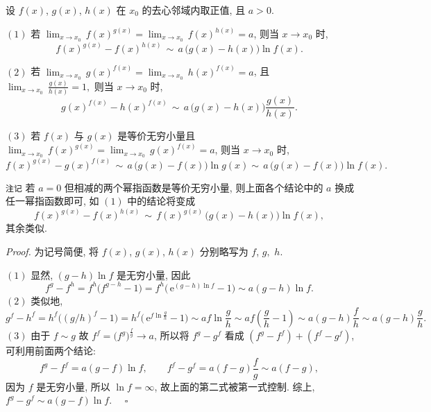 


\begin{theorem}{}
设 $f(x)$, $g(x)$, $h(x)$ 在 $x_{0}$ 的去心邻域内取正值,
且 $a>0$. 

$(1)$ 若 ${\displaystyle \lim_{x\to x_{0}}}\,f(x)^{g(x)}={\displaystyle \lim_{x\to x_{0}}}\,f(x)^{h(x)}=a$,
则当 $x\to x_{0}$ 时, 
$$
f(x)^{g(x)}-f(x)^{h(x)}\,\sim\,a\,\big(g(x)-h(x)\big)\ln f(x).~
$$
 

$(2)$ 若 ${\displaystyle {\displaystyle \lim_{x\to x_{0}}}\,}g(x)^{f(x)}={\displaystyle \lim_{x\to x_{0}}}\,h(x)^{f(x)}=a$,
且 ${\displaystyle \lim_{x\to x_{0}}}\,{\displaystyle \frac{g(x)}{h(x)}}=1,$
则当 $x\to x_{0}$ 时, 
\[
g(x)^{f(x)}-h(x)^{f(x)}\,\sim\,a\,\big(g(x)-h(x)\big)\frac{g(x)}{h(x)}.~
\]

$(3)$ 若 $f(x)$ 与 $g(x)$ 是等价无穷小量且 ${\displaystyle {\displaystyle \lim_{x\to x_{0}}}\,}f(x)^{g(x)}={\displaystyle \lim_{x\to x_{0}}}\,g(x)^{f(x)}=a$,
则当 $x\to x_{0}$ 时, 
\[
f(x)^{g(x)}-g(x)^{f(x)}\,\sim\,a\,\big(g(x)-f(x)\big)\ln g(x)\sim\,a\,\big(g(x)-f(x)\big)\ln f(x).~
\]

\verb`注记`
若 $a=0$ 但相减的两个幂指函数是等价无穷小量, 则上面各个结论中的 $a$ 换成任一幂指函数即可, 如 $(1)$ 中的结论将变成
\[
f(x)^{g(x)}-f(x)^{h(x)}\,\sim\,f(x)^{g(x)}\,\big(g(x)-h(x)\big)\ln f(x),~
\]
其余类似. 

\end{theorem}


\textsl{Proof.} 为记号简便, 将 $f(x)$, $g(x)$, $h(x)$ 分别略写为 $f$, $g,$ $h$. 

$(1)$ 显然, $(g-h)\ln f$ 是无穷小量, 因此
\[
f^{g}-f^{h}=f^{h}\big(f^{g-h}-1\big)=f^{h}\big(\,\mathrm{e}^{(g-h)\ln f}-1\big)\sim a(g-h)\ln f.~
\]
 $(2)$ 类似地, 
\[
g^{f}-h^{f}=h^{f}\big((g/h)^{f}-1\big)=h^{f}\big(\,\mathrm{e}^{f\ln\frac{g}{h}}-1\big)\sim af\ln\frac{g}{h}\sim af\left(\frac{g}{h}-1\right)\sim a(g-h)\frac{f}{h}\sim a(g-h)\frac{g}{h}.~
\]
 $(3)$ 由于 $f\sim g$ 故 $f^{f}=\big(f^{g}\big)^{\frac{f}{g}}\to a$,
所以将 $f^{g}-g^{f}$ 看成 $(f^{g}-f^{f})+(f^{f}-g^{f})$, 可利用前面两个结论: 
\[
f^{g}-f^{f}=a(g-f)\ln f,\qquad f^{f}-g^{f}=a(f-g)\frac{f}{g}\sim a(f-g),~
\]
因为 $f$ 是无穷小量, 所以 $\ln f=\infty$, 故上面的第二式被第一式控制. 综上, $f^{g}-g^{f}\sim a(g-f)\ln f.$ $\quad\square$

